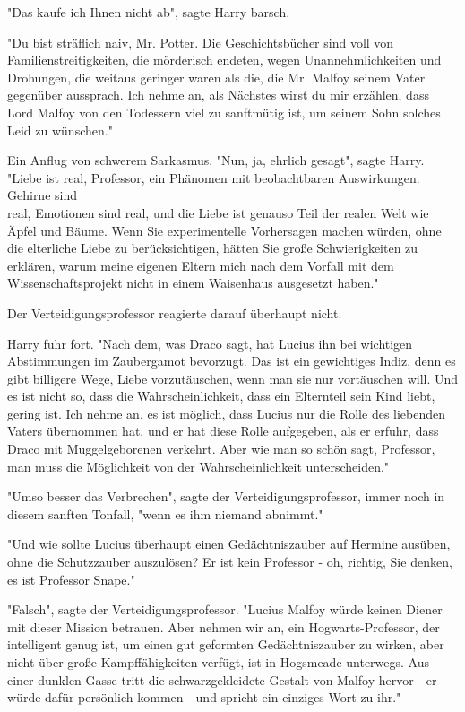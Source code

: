 {"Das kaufe ich Ihnen nicht ab", sagte Harry barsch.

"Du bist sträflich naiv, Mr. Potter. Die Geschichtsbücher sind voll von Familienstreitigkeiten, die mörderisch endeten, wegen Unannehmlichkeiten und Drohungen, die weitaus geringer waren als die, die Mr. Malfoy seinem Vater gegenüber aussprach. Ich nehme an, als Nächstes wirst du mir erzählen, dass Lord Malfoy von den Todessern viel zu sanftmütig ist, um seinem Sohn solches Leid zu wünschen."

Ein Anflug von schwerem Sarkasmus. "Nun, ja, ehrlich gesagt", sagte Harry. "Liebe ist real, Professor, ein Phänomen mit beobachtbaren Auswirkungen. Gehirne sind\\ real, Emotionen sind real, und die Liebe ist genauso Teil der realen Welt wie Äpfel und Bäume. Wenn Sie experimentelle Vorhersagen machen würden, ohne die elterliche Liebe zu berücksichtigen, hätten Sie große Schwierigkeiten zu erklären, warum meine eigenen Eltern mich nach dem Vorfall mit dem Wissenschaftsprojekt nicht in einem Waisenhaus ausgesetzt haben."

Der Verteidigungsprofessor reagierte darauf überhaupt nicht.

Harry fuhr fort. "Nach dem, was Draco sagt, hat Lucius ihn bei wichtigen Abstimmungen im Zaubergamot bevorzugt. Das ist ein gewichtiges Indiz, denn es gibt billigere Wege, Liebe vorzutäuschen, wenn man sie nur vortäuschen will. Und es ist nicht so, dass die Wahrscheinlichkeit, dass ein Elternteil sein Kind liebt, gering ist. Ich nehme an, es ist möglich, dass Lucius nur die Rolle des liebenden Vaters übernommen hat, und er hat diese Rolle aufgegeben, als er erfuhr, dass Draco mit Muggelgeborenen verkehrt. Aber wie man so schön sagt, Professor, man muss die Möglichkeit von der Wahrscheinlichkeit unterscheiden."

"Umso besser das Verbrechen", sagte der Verteidigungsprofessor, immer noch in diesem sanften Tonfall, "wenn es ihm niemand abnimmt."

"Und wie sollte Lucius überhaupt einen Gedächtniszauber auf Hermine ausüben, ohne die Schutzzauber auszulösen? Er ist kein Professor - oh, richtig, Sie denken, es ist Professor Snape."

"Falsch", sagte der Verteidigungsprofessor. "Lucius Malfoy würde keinen Diener mit dieser Mission betrauen. Aber nehmen wir an, ein Hogwarts-Professor, der intelligent genug ist, um einen gut geformten Gedächtniszauber zu wirken, aber nicht über große Kampffähigkeiten verfügt, ist in Hogsmeade unterwegs. Aus einer dunklen Gasse tritt die schwarzgekleidete Gestalt von Malfoy hervor - er würde dafür persönlich kommen - und spricht ein einziges Wort zu ihr."

}
